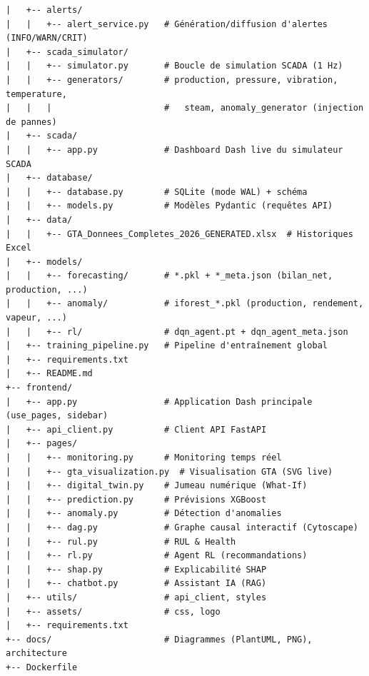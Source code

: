 \begin{verbatim}
|   +-- alerts/
|   |   +-- alert_service.py   # Génération/diffusion d'alertes (INFO/WARN/CRIT)
|   +-- scada_simulator/
|   |   +-- simulator.py       # Boucle de simulation SCADA (1 Hz)
|   |   +-- generators/        # production, pressure, vibration, temperature,
|   |   |                      #   steam, anomaly_generator (injection de pannes)
|   +-- scada/
|   |   +-- app.py             # Dashboard Dash live du simulateur SCADA
|   +-- database/
|   |   +-- database.py        # SQLite (mode WAL) + schéma
|   |   +-- models.py          # Modèles Pydantic (requêtes API)
|   +-- data/
|   |   +-- GTA_Donnees_Completes_2026_GENERATED.xlsx  # Historiques Excel
|   +-- models/
|   |   +-- forecasting/       # *.pkl + *_meta.json (bilan_net, production, ...)
|   |   +-- anomaly/           # iforest_*.pkl (production, rendement, vapeur, ...)
|   |   +-- rl/                # dqn_agent.pt + dqn_agent_meta.json
|   +-- training_pipeline.py   # Pipeline d'entraînement global
|   +-- requirements.txt
|   +-- README.md
+-- frontend/
|   +-- app.py                 # Application Dash principale (use_pages, sidebar)
|   +-- api_client.py          # Client API FastAPI
|   +-- pages/
|   |   +-- monitoring.py      # Monitoring temps réel
|   |   +-- gta_visualization.py  # Visualisation GTA (SVG live)
|   |   +-- digital_twin.py    # Jumeau numérique (What-If)
|   |   +-- prediction.py      # Prévisions XGBoost
|   |   +-- anomaly.py         # Détection d'anomalies
|   |   +-- dag.py             # Graphe causal interactif (Cytoscape)
|   |   +-- rul.py             # RUL & Health
|   |   +-- rl.py              # Agent RL (recommandations)
|   |   +-- shap.py            # Explicabilité SHAP
|   |   +-- chatbot.py         # Assistant IA (RAG)
|   +-- utils/                 # api_client, styles
|   +-- assets/                # css, logo
|   +-- requirements.txt
+-- docs/                      # Diagrammes (PlantUML, PNG), architecture
+-- Dockerfile
\end{verbatim}
